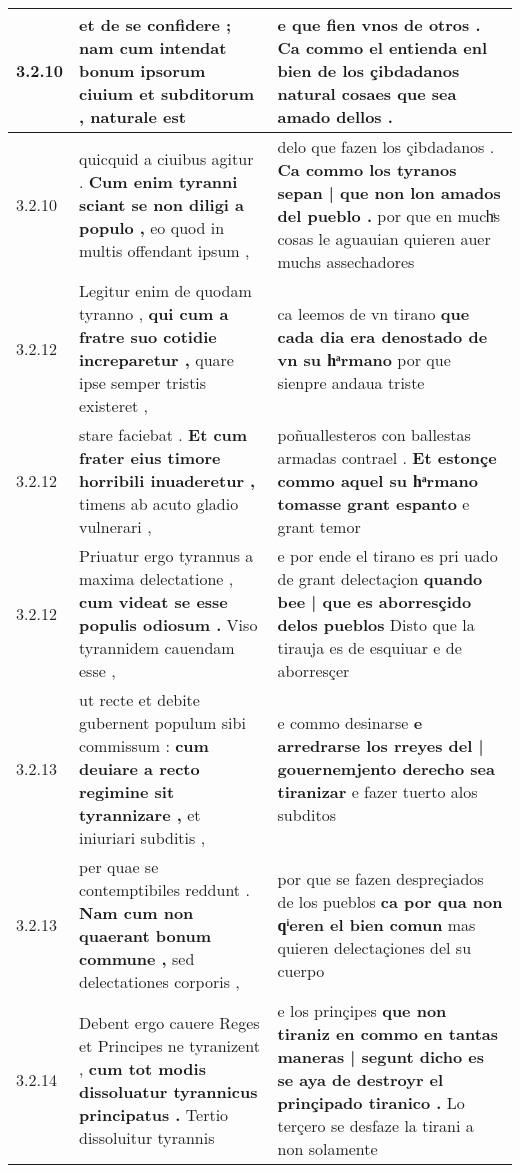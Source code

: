 \begin{tabular}{|p{1cm}|p{6.5cm}|p{6.5cm}|}
3.2.10 & et de se confidere ; \textbf{ nam cum intendat bonum ipsorum ciuium et subditorum , } naturale est & e que fien vnos de otros . \textbf{ Ca commo el entienda enl bien de los çibdadanos natural } cosaes que sea amado dellos . \\\hline
3.2.10 & quicquid a ciuibus agitur . \textbf{ Cum enim tyranni sciant se non diligi a populo , } eo quod in multis offendant ipsum , & delo que fazen los çibdadanos . \textbf{ Ca commo los tyranos sepan | que non lon amados del pueblo . } por que en muchͣs cosas le aguauian quieren auer muchs assechadores \\\hline
3.2.12 & Legitur enim de quodam tyranno , \textbf{ qui cum a fratre suo cotidie increparetur , } quare ipse semper tristis existeret , & ca leemos de vn tirano \textbf{ que cada dia era denostado de vn su hͣrmano } por que sienpre andaua triste \\\hline
3.2.12 & stare faciebat . \textbf{ Et cum frater eius timore horribili inuaderetur , } timens ab acuto gladio vulnerari , & poñuallesteros con ballestas armadas contrael . \textbf{ Et estonçe commo aquel su hͣrmano tomasse grant espanto } e grant temor \\\hline
3.2.12 & Priuatur ergo tyrannus a maxima delectatione , \textbf{ cum videat se esse populis odiosum . } Viso tyrannidem cauendam esse , & e por ende el tirano es pri uado de grant delectaçion \textbf{ quando bee | que es aborresçido delos pueblos } Disto que la tirauja es de esquiuar e de aborresçer \\\hline
3.2.13 & ut recte et debite gubernent populum sibi commissum : \textbf{ cum deuiare a recto regimine sit tyrannizare , } et iniuriari subditis , & e commo desinarse \textbf{ e arredrarse los rreyes del | gouernemjento derecho sea tiranizar } e fazer tuerto alos subditos \\\hline
3.2.13 & per quae se contemptibiles reddunt . \textbf{ Nam cum non quaerant bonum commune , } sed delectationes corporis , & por que se fazen despreçiados de los pueblos \textbf{ ca por qua non qͥeren el bien comun } mas quieren delectaçiones del su cuerpo \\\hline
3.2.14 & Debent ergo cauere Reges et Principes ne tyranizent , \textbf{ cum tot modis dissoluatur tyrannicus principatus . } Tertio dissoluitur tyrannis & e los prinçipes \textbf{ que non tiraniz en commo en tantas maneras | segunt dicho es se aya de destroyr el prinçipado tiranico . } Lo terçero se desfaze la tirani a non solamente \\\hline

\end{tabular}
